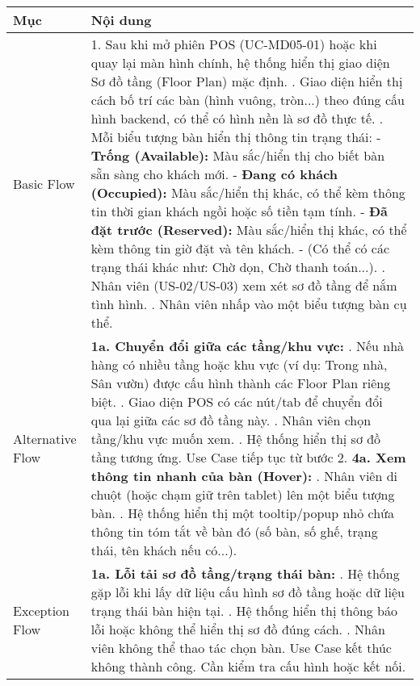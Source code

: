 \begin{longtable}{|m{4cm}|p{11cm}|}
\hline
\textbf{Mục} & \textbf{Nội dung} \\
\hline
Basic Flow & 1. Sau khi mở phiên POS (UC-MD05-01) hoặc khi quay lại màn hình chính, hệ thống hiển thị giao diện Sơ đồ tầng (Floor Plan) mặc định. \newline 2. Giao diện hiển thị cách bố trí các bàn (hình vuông, tròn...) theo đúng cấu hình backend, có thể có hình nền là sơ đồ thực tế. \newline 3. Mỗi biểu tượng bàn hiển thị thông tin trạng thái: \newline    - \textbf{Trống (Available):} Màu sắc/hiển thị cho biết bàn sẵn sàng cho khách mới. \newline    - \textbf{Đang có khách (Occupied):} Màu sắc/hiển thị khác, có thể kèm thông tin thời gian khách ngồi hoặc số tiền tạm tính. \newline    - \textbf{Đã đặt trước (Reserved):} Màu sắc/hiển thị khác, có thể kèm thông tin giờ đặt và tên khách. \newline    - (Có thể có các trạng thái khác như: Chờ dọn, Chờ thanh toán...). \newline 4. Nhân viên (US-02/US-03) xem xét sơ đồ tầng để nắm tình hình. \newline 5. Nhân viên nhấp vào một biểu tượng bàn cụ thể. \\
\hline
Alternative Flow & \textbf{1a. Chuyển đổi giữa các tầng/khu vực:} \newline    1. Nếu nhà hàng có nhiều tầng hoặc khu vực (ví dụ: Trong nhà, Sân vườn) được cấu hình thành các Floor Plan riêng biệt. \newline    2. Giao diện POS có các nút/tab để chuyển đổi qua lại giữa các sơ đồ tầng này. \newline    3. Nhân viên chọn tầng/khu vực muốn xem. \newline    4. Hệ thống hiển thị sơ đồ tầng tương ứng. Use Case tiếp tục từ bước 2. \newline \textbf{4a. Xem thông tin nhanh của bàn (Hover):} \newline    1. Nhân viên di chuột (hoặc chạm giữ trên tablet) lên một biểu tượng bàn. \newline    2. Hệ thống hiển thị một tooltip/popup nhỏ chứa thông tin tóm tắt về bàn đó (số bàn, số ghế, trạng thái, tên khách nếu có...). \\
\hline
Exception Flow & \textbf{1a. Lỗi tải sơ đồ tầng/trạng thái bàn:} \newline    1. Hệ thống gặp lỗi khi lấy dữ liệu cấu hình sơ đồ tầng hoặc dữ liệu trạng thái bàn hiện tại. \newline    2. Hệ thống hiển thị thông báo lỗi hoặc không thể hiển thị sơ đồ đúng cách. \newline    3. Nhân viên không thể thao tác chọn bàn. Use Case kết thúc không thành công. Cần kiểm tra cấu hình hoặc kết nối. \\

\end{longtable}
